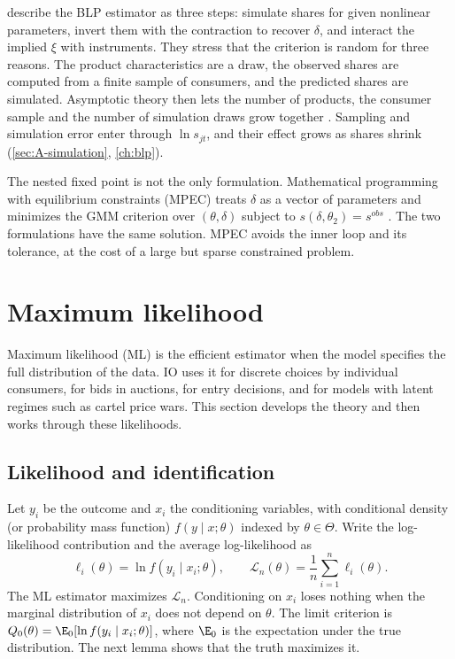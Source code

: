 \citet{AckerbergEtAl2007} describe the BLP estimator as three steps: simulate shares for given nonlinear parameters, invert
them with the contraction to recover $\delta$, and interact the implied $\xi$ with instruments. They stress that the
criterion is random for three reasons. The product characteristics are a draw, the observed shares are computed from a
finite sample of consumers, and the predicted shares are simulated. Asymptotic theory then lets the number of products,
the consumer sample and the number of simulation draws grow together \citep{BerryLintonPakes2004}. Sampling and simulation
error enter through $\ln s_{jt}$, and their effect grows as shares shrink (\cref{sec:A-simulation}, \cref{ch:blp}).

The nested fixed point is not the only formulation. Mathematical programming with equilibrium constraints (MPEC) treats
$\delta$ as a vector of parameters and minimizes the GMM criterion over $(\theta, \delta)$ subject to
$s(\delta, \theta_2) = s^{\mathit{obs}}$ \citep{SuJudd2012, DubeFoxSu2012}. The two formulations have the same solution.
MPEC avoids the inner loop and its tolerance, at the cost of a large but sparse constrained problem.

\section{Maximum likelihood}\label{sec:A-mle}

Maximum likelihood (ML) is the efficient estimator when the model specifies the full distribution of the data. IO uses
it for discrete choices by individual consumers, for bids in auctions, for entry decisions, and for models with latent
regimes such as cartel price wars. This section develops the theory and then works through these likelihoods.

\subsection{Likelihood and identification}\label{sec:A-mle-ident}

Let $y_i$ be the outcome and $x_i$ the conditioning variables, with conditional density (or probability mass function)
$f(y \mid x;\theta)$ indexed by $\theta \in \Theta$. Write the log-likelihood contribution and the average log-likelihood as
\begin{equation*}
  \ell_i(\theta) = \ln f(y_i \mid x_i;\theta), \qquad \mathcal{L}_n(\theta) = \frac{1}{n}\sum_{i=1}^n\ell_i(\theta).
\end{equation*}
The ML estimator maximizes $\mathcal{L}_n$. Conditioning on $x_i$ loses nothing when the marginal distribution of $x_i$ does
not depend on $\theta$. The limit criterion is $Q_0(\theta) = \E_0[\ln f(y_i \mid x_i;\theta)]$, where $\E_0$ is the
expectation under the true distribution. The next lemma shows that the truth maximizes it.

